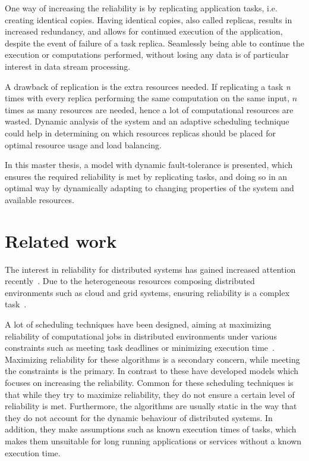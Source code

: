 \documentclass{cslthse-msc}
\begin{document}
One way of increasing the reliability is by replicating application tasks, i.e. creating identical copies. Having identical copies, also called replicas, results in increased redundancy, and allows for continued execution of the application, despite the event of failure of a task replica. Seamlessly being able to continue the execution or computations performed, without losing any data is of particular interest in data stream processing.

A drawback of replication is the extra resources needed. If replicating a task \emph{n} times with every replica performing the same computation on the same input, $n$ times as many resources are needed, hence a lot of computational resources are wasted. Dynamic analysis of the system and an adaptive scheduling technique could help in determining on which resources replicas should be placed for optimal resource usage and load balancing.

In this master thesis, a model with dynamic fault-tolerance is presented, which ensures the required reliability is met by replicating tasks, and doing so in an optimal way by dynamically adapting to changing properties of the system and available resources.

\section{Related work} \label{sec:introduction_related_work}
The interest in reliability for distributed systems has gained increased attention recently~\cite{replicationManagement}. Due to the heterogeneous resources composing distributed environments such as cloud and grid systems, ensuring reliability is a complex task~\cite{cloudServiceRel, surveyReliabilityDistr}.

A lot of scheduling techniques have been designed, aiming at maximizing reliability of computational jobs in distributed environments under various constraints such as meeting task deadlines or minimizing execution time~\cite{algoOptTimeMaxRel, optTaskAllocationForMaxRel, taskAllocation, taskAllocationSwarm, algoMaxRelEndToEndConstraint, algoMinExTime, schedReplicas}. Maximizing reliability for these algorithms is a secondary concern, while meeting the constraints is the primary. In contrast to these \cite{optResourceAllMaxPerformance, matchSchedAlgoMinFailure, safetyRelTaskAllocation, improvedTaskAllMaxRel} have developed models which focuses on increasing the reliability. Common for these scheduling techniques is that while they try to maximize reliability, they do not ensure a certain level of reliability is met. Furthermore, the algorithms are usually static in the way that they do not account for the dynamic behaviour of distributed systems. In addition, they make assumptions such as known execution times of tasks, which makes them unsuitable for long running applications or services without a known execution time.
\end{document}

